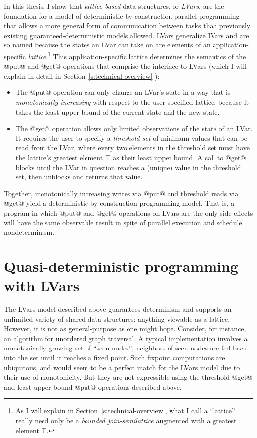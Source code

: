 In this thesis, I show that \emph{lattice-based} data structures,
or \emph{LVars}, are the foundation for a model of
deterministic-by-construction parallel programming that allows a more
general form of communication between tasks than previously existing
guaranteed-deterministic models allowed.  LVars generalize IVars and
are so named because the states an LVar can take on are elements of an
application-specific \emph{lattice}.\footnote{As I will explain in
  Section~\ref{s:technical-overview}, what I call a ``lattice'' really
  need only be a {\em bounded join-semilattice} augmented with a
  greatest element $\top$.}   
This application-specific lattice
determines the semantics of the @put@ and @get@ operations that
comprise the interface to LVars (which I will explain in detail in
Section~\ref{s:technical-overview} ):
\begin{itemize}
\item The @put@ operation can only change an LVar's state in a way
  that is {\em monotonically increasing} with respect to the
  user-specified lattice, because it takes the least upper bound of
  the current state and the new state.
\item The @get@ operation allows only limited observations of the
  state of an LVar.  It requires the user to specify a \emph{threshold
    set} of minimum values that can be read from the LVar, where every
  two elements in the threshold set must have the lattice's greatest
  element $\top$ as their least upper bound.  A call to @get@ blocks
  until the LVar in question reaches a (unique) value in the threshold
  set, then unblocks and returns that value.
\end{itemize}
Together, monotonically increasing writes via @put@ and threshold
reads via @get@ yield a deterministic-by-construction programming
model.  That is, a program in which @put@ and @get@ operations on LVars are the
only side effects will have the same observable result in spite of
parallel execution and schedule nondeterminism.

\section{Quasi-deterministic programming with LVars}

The LVars model described above guarantees determinism and supports an
unlimited variety of shared data structures: anything viewable as a
lattice.  However, it is not as general-purpose as one might hope.
Consider, for instance, an algorithm for unordered graph traversal.  A
typical implementation involves a monotonically growing set of ``seen
nodes''; neighbors of seen nodes are fed back into the set until it
reaches a fixed point.  Such fixpoint computations are ubiquitous, and
would seem to be a perfect match for the LVars model due to their use
of monotonicity.  But they are not expressible using the threshold
@get@ and least-upper-bound @put@ operations described above.

